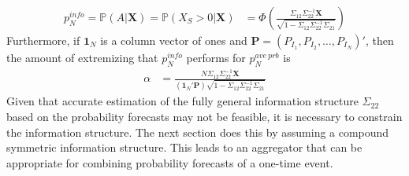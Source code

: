 \documentclass[11pt]{article}
\renewcommand{\P}{\mathbb{P}}
\theoremstyle{definition}
\theoremstyle{definition}
\begin{document}
\begin{align}
p_N^{info} = \P\left(A  | \boldsymbol{X}\right)  = \P\left(X_{S} > 0 | \boldsymbol{X}\right) &= \Phi\left( \frac{\Sigma_{12} \Sigma_{22}^{-1} \boldsymbol{X}}{\sqrt{1 - \Sigma_{12} \Sigma_{22}^{-1} \Sigma_{21}}}\right) \label{GeneralAggregator}
\end{align}
Furthermore, if $\boldsymbol{1}_N$ is a column vector of ones and $\boldsymbol{P} = (P_{I_1}, P_{I_2}, \dots, P_{I_N})'$, then the amount of extremizing that $p_N^{info}$ performs for $p_{N}^{ave\ prb}$ is
\begin{align*}
\alpha  &= \frac{N \Sigma_{12} \Sigma_{22}^{-1} \boldsymbol{X}}{\left(\boldsymbol{1}_N' \boldsymbol{P} \right) \sqrt{1 - \Sigma_{12} \Sigma_{22}^{-1} \Sigma_{21}}} 
\end{align*}
Given that accurate estimation of the fully general information structure $\Sigma_{22}$ based on the probability forecasts may not be feasible, it is necessary to constrain the information structure. The next section does this by assuming a compound symmetric information structure. This leads to an aggregator that can be appropriate for combining probability forecasts of a one-time event. 



\end{document}
